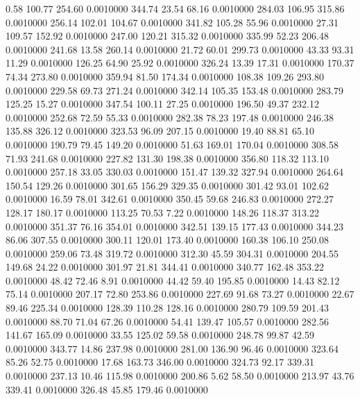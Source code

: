    0.58  100.77  254.60   0.0010000
 344.74   23.54   68.16   0.0010000
 284.03  106.95  315.86   0.0010000
 256.14  102.01  104.67   0.0010000
 341.82  105.28   55.96   0.0010000
  27.31  109.57  152.92   0.0010000
 247.00  120.21  315.32   0.0010000
 335.99   52.23  206.48   0.0010000
 241.68   13.58  260.14   0.0010000
  21.72   60.01  299.73   0.0010000
  43.33   93.31   11.29   0.0010000
 126.25   64.90   25.92   0.0010000
 326.24   13.39   17.31   0.0010000
 170.37   74.34  273.80   0.0010000
 359.94   81.50  174.34   0.0010000
 108.38  109.26  293.80   0.0010000
 229.58   69.73  271.24   0.0010000
 342.14  105.35  153.48   0.0010000
 283.79  125.25   15.27   0.0010000
 347.54  100.11   27.25   0.0010000
 196.50   49.37  232.12   0.0010000
 252.68   72.59   55.33   0.0010000
 282.38   78.23  197.48   0.0010000
 246.38  135.88  326.12   0.0010000
 323.53   96.09  207.15   0.0010000
  19.40   88.81   65.10   0.0010000
 190.79   79.45  149.20   0.0010000
  51.63  169.01  170.04   0.0010000
 308.58   71.93  241.68   0.0010000
 227.82  131.30  198.38   0.0010000
 356.80  118.32  113.10   0.0010000
 257.18   33.05  330.03   0.0010000
 151.47  139.32  327.94   0.0010000
 264.64  150.54  129.26   0.0010000
 301.65  156.29  329.35   0.0010000
 301.42   93.01  102.62   0.0010000
  16.59   78.01  342.61   0.0010000
 350.45   59.68  246.83   0.0010000
 272.27  128.17  180.17   0.0010000
 113.25   70.53    7.22   0.0010000
 148.26  118.37  313.22   0.0010000
 351.37   76.16  354.01   0.0010000
 342.51  139.15  177.43   0.0010000
 344.23   86.06  307.55   0.0010000
 300.11  120.01  173.40   0.0010000
 160.38  106.10  250.08   0.0010000
 259.06   73.48  319.72   0.0010000
 312.30   45.59  304.31   0.0010000
 204.55  149.68   24.22   0.0010000
 301.97   21.81  344.41   0.0010000
 340.77  162.48  353.22   0.0010000
  48.42   72.46    8.91   0.0010000
  44.42   59.40  195.85   0.0010000
  14.43   82.12   75.14   0.0010000
 207.17   72.80  253.86   0.0010000
 227.69   91.68   73.27   0.0010000
  22.67   89.46  225.34   0.0010000
 128.39  110.28  128.16   0.0010000
 280.79  109.59  201.43   0.0010000
  88.70   71.04   67.26   0.0010000
  54.41  139.47  105.57   0.0010000
 282.56  141.67  165.09   0.0010000
  33.55  125.02   59.58   0.0010000
 248.78   99.87   42.59   0.0010000
 343.77   14.86  237.98   0.0010000
 281.00  136.90   96.46   0.0010000
 323.64   85.26   52.75   0.0010000
  17.68  163.73  346.00   0.0010000
 324.73   92.17  339.31   0.0010000
 237.13   10.46  115.98   0.0010000
 200.86    5.62   58.50   0.0010000
 213.97   43.76  339.41   0.0010000
 326.48   45.85  179.46   0.0010000
